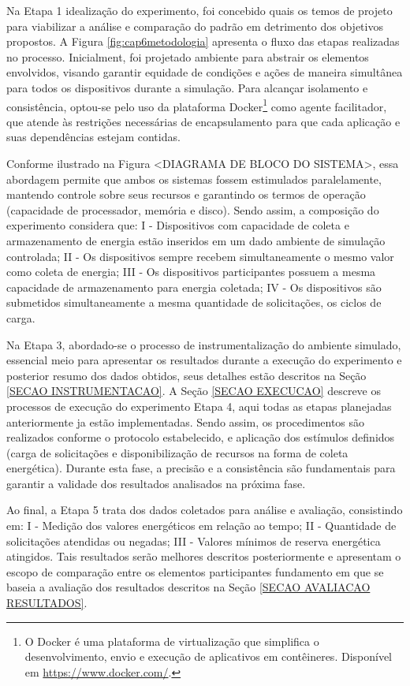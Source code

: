 Na Etapa 1 idealização do experimento, foi concebido quais os temos de projeto para viabilizar a análise e comparação do padrão em detrimento dos objetivos propostos.  A Figura \ref{fig:cap6metodologia} apresenta o fluxo das etapas realizadas no processo. Inicialment, foi projetado ambiente para abstrair os elementos envolvidos, visando garantir equidade de condições e ações de maneira simultânea para todos os dispositivos durante a simulação. Para alcançar isolamento e consistência, optou-se pelo uso da plataforma Docker\footnote{O Docker é uma plataforma de virtualização que simplifica o desenvolvimento, envio e execução de aplicativos em contêineres. Disponível em \url{https://www.docker.com/}.} como agente facilitador, que atende às restrições necessárias de encapsulamento para que cada aplicação e suas dependências estejam contidas. 

Conforme ilustrado na Figura <DIAGRAMA DE BLOCO DO SISTEMA>, essa abordagem permite que ambos os sistemas fossem estimulados paralelamente, mantendo controle sobre seus recursos e garantindo os termos de operação (capacidade de processador, memória e disco). Sendo assim, a composição do experimento considera que:  I - Dispositivos com capacidade de coleta e armazenamento de energia estão inseridos em um dado ambiente de simulação controlada; II - Os dispositivos sempre recebem simultaneamente o mesmo valor como coleta de energia; III - Os dispositivos participantes possuem a mesma capacidade de armazenamento para energia coletada; IV - Os dispositivos são submetidos simultaneamente a mesma quantidade de solicitações, os ciclos de carga.

Na Etapa 3, abordado-se o processo de instrumentalização do ambiente simulado, essencial meio para apresentar os resultados durante a execução do experimento e posterior resumo dos dados obtidos, seus detalhes estão descritos na Seção \ref{SECAO INSTRUMENTACAO}. A Seção \ref{SECAO EXECUCAO} descreve os processos de execução do experimento Etapa 4, aqui todas as etapas planejadas anteriormente ja estão implementadas. Sendo assim, os procedimentos são realizados conforme o protocolo estabelecido, e aplicação dos estímulos definidos  (carga de solicitações e disponibilização de recursos na forma de coleta energética). Durante esta fase, a precisão e a consistência são fundamentais para garantir a validade dos resultados analisados na próxima fase. 

Ao final, a Etapa 5 trata dos dados coletados para análise e avaliação,
consistindo em: I - Medição dos valores energéticos em relação ao tempo; II - Quantidade de solicitações atendidas ou negadas; III - Valores mínimos de reserva energética atingidos. Tais resultados serão melhores descritos posteriormente e apresentam o escopo de comparação entre os elementos participantes fundamento em que se baseia a avaliação dos resultados descritos na Seção \ref{SECAO AVALIACAO RESULTADOS}.

